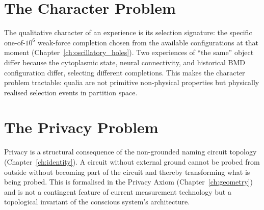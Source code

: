 \section{The Character Problem}

The qualitative character of an experience is its selection signature: the specific one-of-$10^6$ weak-force completion chosen from the available configurations at that moment (Chapter~\ref{ch:oscillatory_holes}). Two experiences of ``the same'' object differ because the cytoplasmic state, neural connectivity, and historical BMD configuration differ, selecting different completions. This makes the character problem tractable: qualia are not primitive non-physical properties but physically realised selection events in partition space.

\section{The Privacy Problem}

Privacy is a structural consequence of the non-grounded naming circuit topology (Chapter~\ref{ch:identity}). A circuit without external ground cannot be probed from outside without becoming part of the circuit and thereby transforming what is being probed. This is formalised in the Privacy Axiom (Chapter~\ref{ch:geometry}) and is not a contingent feature of current measurement technology but a topological invariant of the conscious system's architecture.
